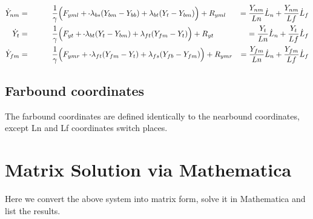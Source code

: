\documentclass[11pt,twocolumn]{article}
\newcommand{\mn}{\scalebox{0.7}[1.0]{-}}
\begin{document}
\begin{align}
  \dot{Y}_{nm} &= \hspace{1cm} \frac{1}{\gamma} \Big(F_{yml} + \mn \lambda_{bs}(Y_{bm} - Y_{bb})
  + \lambda_{bt}(Y_{t } - Y_{bm}) \Big) + R_{yml}
  &= \frac{Y_{nm}}{Ln}\dot{L}_n + \frac{Y_{nm}}{Lf}\dot{L}_f\\
  \dot{Y}_{t}  &= \hspace{1cm} \frac{1}{\gamma} \Big(F_{yt } + \mn \lambda_{bt}(Y_{t } - Y_{bm})
  + \lambda_{ft}(Y_{fm} - Y_{t }) \Big) + R_{yt }
  &= \frac{Y_{t}}{Ln}\dot{L}_n + \frac{Y_{t}}{Lf}\dot{L}_f\\
  \dot{Y}_{fm} &= \hspace{1cm} \frac{1}{\gamma} \Big(F_{ymr} + \mn \lambda_{ft}(Y_{fm} - Y_{t })
  + \lambda_{fs}(Y_{fb} - Y_{fm}) \Big) + R_{ymr}
  &= \frac{Y_{fm}}{Ln}\dot{L}_n + \frac{Y_{fm}}{Lf}\dot{L}_f
\end{align}

\subsection{Farbound coordinates}
The farbound coordinates are defined identically to the nearbound coordinates, except
Ln and Lf coordinates switch places.

\section{Matrix Solution via Mathematica}
Here we convert the above system into matrix form, solve it in Mathematica and list the results.
\end{document}
